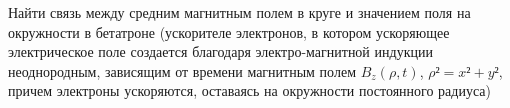 \begin{tproblem}
  Найти связь между средним магнитным полем в круге и значением поля
  на окружности в бетатроне (ускорителе электронов, в котором
  ускоряющее электрическое поле создается благодаря электро-магнитной
  индукции неоднородным, зависящим от времени магнитным полем
  $B_z(ρ,t)$, $ρ² = x² + y²$, причем электроны ускоряются, оставаясь на окружности постоянного радиуса)
\end{tproblem}
 
